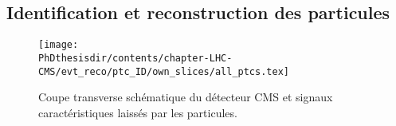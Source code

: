 \subsection{Identification et reconstruction des particules}\label{chapter-LHC-section-evt_reco-subsec-ptc_ID}
\begin{figure}
\texttt{[image: \\PhDthesisdir/contents/chapter-LHC-CMS/evt\_reco/ptc\_ID/own\_slices/all\_ptcs.tex]}
\caption[Coupe transverse schématique du détecteur CMS.]{Coupe transverse schématique du détecteur CMS et signaux caractéristiques laissés par les particules.}
\label{fig-chapter-LHC-section-evt_reco-subsec-ptc_ID-cms_slice}
\end{figure}